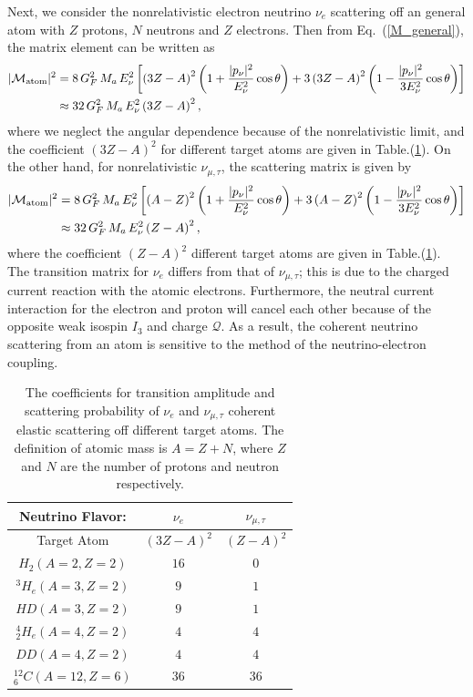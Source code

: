 Next, we consider the nonrelativistic electron neutrino $\nu_e$ scattering off an general atom with $Z$ protons, $N$ neutrons and $Z$ electrons. Then from Eq.~(\ref{M_general}), the matrix element can be written as
\begin{align}
\label{Probability_e}
|\mathcal{M}_{\mathrm{atom}}|^2&=8\,G^2_F\,M_a\,E_\nu^2\left[\left(3Z-A\right)^2\left(1+\frac{|p_\nu|^2}{E^2_\nu}\cos\theta\right)+3\left(3Z-A\right)^2\left(1-\frac{|p_\nu|^2}{3E_\nu^2}\cos\theta\right)\right]\notag\\
&\approx32\,G^2_F\,M_a\,E_\nu^2\left(3Z-A\right)^2,
\end{align}
where we neglect the angular dependence because of the nonrelativistic limit, and the coefficient $\left(3Z-A\right)^2$ for different target atoms are given in Table.(\ref{Table001}). On the other hand, for nonrelativistic $\nu_{\mu,\tau}$, the scattering matrix is given by
\begin{align}
\label{Probability_mt}
|\mathcal{M}_{\mathrm{atom}}|^2&=8\,G^2_F\,M_a\,E_\nu^2\left[\left(A-Z\right)^2\left(1+\frac{|p_\nu|^2}{E^2_\nu}\cos\theta\right)+3\left(A-Z\right)^2\left(1-\frac{|p_\nu|^2}{3E_\nu^2}\cos\theta\right)\right]\notag\\
&\approx32\,G^2_F\,M_a\,E_\nu^2\left(Z-A\right)^2,
\end{align}
where the coefficient $\left(Z-A\right)^2$ different target atoms are given in Table.(\ref{Table001}). The transition matrix for $\nu_e$ differs from that of $\nu_{\mu,\tau}$; this is due to the charged current reaction with the atomic electrons. Furthermore, the neutral current interaction for the electron and proton will cancel each other because of the opposite weak isospin $I_3$ and charge $\mathcal{Q}$. As a result, the coherent neutrino scattering from an atom is sensitive to the method of the neutrino-electron coupling.
\begin{table}[ht]
\centering
\begin{tabular}{c|c|c}
\hline\hline
 Neutrino Flavor:&$\nu_e$ &$\nu_{\mu,\tau}$\\
\hline\hline
Target Atom & $(3Z-A)^2$  & $(Z-A)^2$\\
\hline
$H_2(A=2, Z=2)$ & $16$ & $0$\\
\hline
${}^{3}H_e(A=3, Z=2)$  & $9$ & $1$\\
\hline
$HD(A=3, Z=2)$ & $9$   & $1$\\
\hline
${}^{4}_2H_e(A=4, Z=2)$  &$4$ & $4$\\
\hline
$DD(A=4, Z=2)$  & $4$ & $4$\\
\hline
${}^{12}_{{}6}C(A=12, Z=6)$  & $36$& $36$\\
\hline\hline
\end{tabular}
\caption{The coefficients for transition amplitude and scattering probability of $\nu_e$ and $\nu_{\mu,\tau}$  coherent elastic scattering off different target atoms. The definition of atomic mass is $A=Z+N$, where $Z$ and $N$ are the number of protons and neutron respectively.}
\label{Table001}  
\end{table}%

